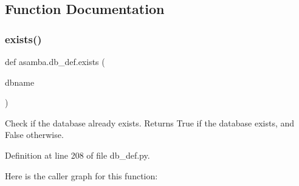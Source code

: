 \subsection{Function Documentation}
\mbox{\label{namespaceasamba_1_1db__def_ae036f59b82c15b96d4d833e9f2fa5d95}} 
\subsubsection{\texorpdfstring{exists()}{exists()}}
{\footnotesize\ttfamily def asamba.\+db\+\_\+def.\+exists (\begin{DoxyParamCaption}\item[{}]{dbname }\end{DoxyParamCaption})}

\begin{DoxyVerb}Check if the database already exists.
Returns True if the database exists, and False otherwise.
\end{DoxyVerb}
 

Definition at line 208 of file db\+\_\+def.\+py.

Here is the caller graph for this function\+:
